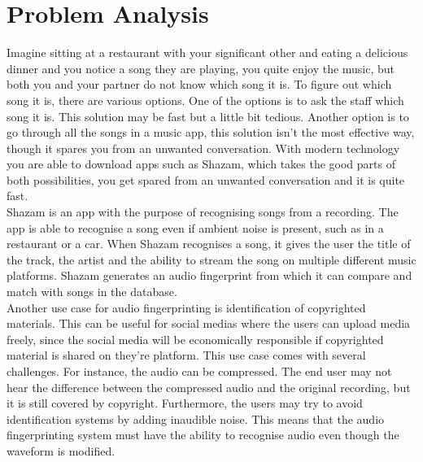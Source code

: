 \chapter{Problem Analysis}
Imagine sitting at a restaurant with your significant other and eating a delicious dinner and you notice a song they are playing, you quite enjoy the music, but both you and your partner do not know which song it is. To figure out which song it is, there are various options. One of the options is to ask the staff which song it is. This solution may be fast but a little bit tedious. Another option is to go through all the songs in a music app, this solution isn't the most effective way, though it spares you from an unwanted conversation. With modern technology you are able to download apps such as Shazam, which takes the good parts of both possibilities, you get spared from an unwanted conversation and it is quite fast.\\
Shazam is an app with the purpose of recognising songs from a recording. The app is able to recognise a song even if ambient noise is present, such as in a restaurant or a car. When Shazam recognises a song, it gives the user the title of the track, the artist and the ability to stream the song on multiple different music platforms. Shazam generates an audio fingerprint from which it can compare and match with songs in the database. \cite{ShazamDescription} \\
Another use case for audio fingerprinting is identification of copyrighted materials. This can be useful for social medias where the users can upload media freely, since the social media will be economically responsible if copyrighted material is shared on they're platform. 
This use case comes with several challenges. For instance, the audio can be compressed. The end user may not hear the difference between the compressed audio and the original recording, but it is still covered by copyright. Furthermore, the users may try to avoid identification systems by adding inaudible noise. This means that the audio fingerprinting system must have the ability to recognise audio even though the waveform is modified. \cite{haitsma2003highly}

